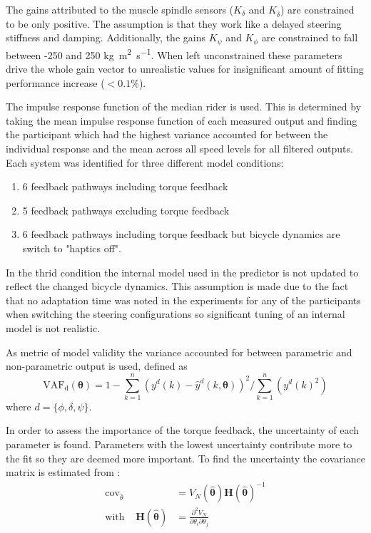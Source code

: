The gains attributed to the muscle spindle sensors (\ensuremath{K_\delta} and \ensuremath{K_{\dot{\delta}}}) are constrained to be only positive. The assumption is that they work like a delayed steering stiffness and damping. Additionally, the gains \ensuremath{K_\psi} and \ensuremath{K_\phi}  are constrained to fall between -250 and 250 \si{\kilogram\square\meter\per\second}.  When left unconstrained these parameters drive the whole gain vector to unrealistic values for insignificant amount of fitting performance increase (\ensuremath{<0.1\%}).

The impulse response function of the median rider is used. This is determined by taking the mean impulse response function of each measured output and finding the participant which had the highest variance accounted for between the individual response and the mean across all speed levels for all filtered outputs. Each system was identified for three different model conditions: 
\begin{enumerate}
    \item  6 feedback pathways including torque feedback
    \item  5 feedback pathways excluding torque feedback
    \item  6 feedback pathways including torque feedback but bicycle dynamics are switch to "haptics off".
\end{enumerate}
In the thrid condition the internal model used in the predictor is not updated to reflect the changed bicycle dynamics. This assumption is made due to the fact that no adaptation time  was noted in the experiments for any of the participants when switching the steering configurations so significant tuning of an internal model is not realistic. 

 As metric of model validity the variance accounted for between parametric and non-parametric output is used, defined as
\begin{equation}
\mathrm{VAF_d}(\boldsymbol{\theta})=1 -\sum_{k=1}^{n}\left(y^{d}(k)-\hat{y}^{d}(k, \boldsymbol{\theta})\right)^{2} / \sum_{k=1}^{n}\left(y^{d}(k)^{2}\right)
\label{eq:VAF}
\end{equation} 
where \ensuremath{d=\{\phi,\delta,\psi\}}. 

In order to assess the importance of the torque feedback, the uncertainty of each parameter is found. Parameters with the lowest uncertainty contribute more to the fit so they are deemed more important. To find the uncertainty the covariance matrix is estimated from :
\begin{align}
    \operatorname{cov}_{\hat{\theta}}  &=V_N(\boldsymbol{\hat{\theta}})\boldsymbol{H}(\boldsymbol{\hat{\theta}})^{-1}
    \label{fig:cov_mat}
    \\ \text{with} \;\;\;\;  \boldsymbol{H}(\boldsymbol{\hat{\theta}})&= \frac{\partial^{2} V_N}{\partial \theta_{i} \partial \theta_{j}}
\end{align}


